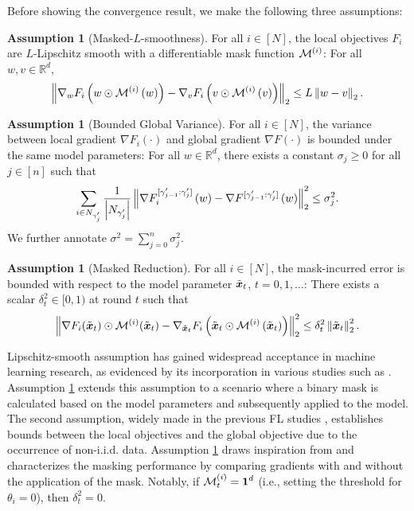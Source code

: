 \documentclass{article}
\renewcommand{\cite}{\citep}
\theoremstyle{plain}
\theoremstyle{definition}
\newtheorem{assumption}[theorem]{Assumption}
\theoremstyle{remark}
\newcommand{\bracket}[1]{\left(#1\right)}
\newcommand{\norm}[1]{\left\|#1\right\|_2^2}
\newcommand{\maskgrad}[2]{\nabla_{#2} F_{#1}\bracket{#2 \odot \mask{#1}\bracket{#2}}}
\begin{document}
Before showing the convergence result, we make the following three assumptions: 

\begin{assumption}[Masked-$L$-smoothness] \label{ass:l-smooth}
For all $i \in [N]$, the local objectives $F_i$ are $L$-Lipschitz smooth with a differentiable mask function $\mask{i}$: For all $w, v \in \mathbb{R}^d$, 
\begin{equation*}
    \left\|\maskgrad{i}{w} - \maskgrad{i}{v}\right\|_2 \leq L \left\|w-v\right\|_2. 
\end{equation*}
\end{assumption}

\begin{assumption}[Bounded Global Variance]\label{ass:variance}
For all $i \in [N]$, the variance between local gradient $\nabla F_i(\cdot)$ and global gradient $\nabla F(\cdot)$ is bounded under the same model parameters: For all $w \in \mathbb{R}^d$, there exists a constant $\sigma_j \geq 0$ for all $j \in [n]$ such that
\begin{equation*}
\sum_{i \in \n{j}} \frac{1}{\left|\n{j}\right|} \norm{\partialgrad{i}{j}{w} - \partialgrad{}{j}{w}} \leq \sigma_j^2.
\end{equation*}
We further annotate $\sigma^2 = \sum_{j=0}^n \sigma_j^2$. 
\end{assumption}

\begin{assumption}[Masked Reduction] \label{ass:mask_reduction}
For all $i \in [N]$, the mask-incurred error is bounded with respect to the model parameter $\x{t}$, $t = 0, 1, \dots$: There exists a scalar $\delta_t^2 \in [0, 1)$ at round $t$ such that
\begin{equation*}
    \norm{\nabla F_i(\x{t}) \odot \mask{i}(\x{t}) - \maskgrad{i}{\x{t}}} \leq \delta_t^2 \norm{\x{t}}.
\end{equation*}
\end{assumption}

Lipschitz-smooth assumption has gained widespread acceptance in machine learning research, as evidenced by its incorporation in various studies such as \cite{ajalloeian2020convergence, zhou2023every, ma2021effective, bottou2018optimization, yang2020achieving, yang2022anarchic, wu2022sign}. Assumption \ref{ass:l-smooth} extends this assumption to a scenario where a binary mask is calculated based on the model parameters and subsequently applied to the model. The second assumption, widely made in the previous FL studies \cite{yang2020achieving, yang2022anarchic}, establishes bounds between the local objectives and the global objective due to the occurrence of non-i.i.d. data. Assumption \ref{ass:mask_reduction} draws inspiration from  \cite{zhou2023every, ma2021effective} and characterizes the masking performance by comparing gradients with and without the application of the mask. Notably, if $\mask{i}{t} = \boldsymbol{1}^d$ (i.e., setting the threshold for $\theta_i = 0$), then $\delta_t^2 = 0$. 
\end{document}
